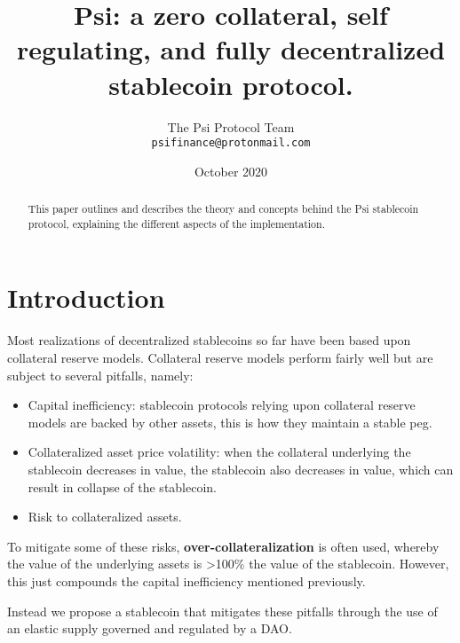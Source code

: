 \documentclass[a4paper, 12pt]{article}
\begin{document}
	\title{\Large{\textbf{Psi: a zero collateral, self regulating, and fully decentralized stablecoin protocol.}}}
	\author{The Psi Protocol Team \\ \texttt{psifinance@protonmail.com}}
	\date{October 2020}

	\maketitle

	\begin{abstract}
		This paper outlines and describes the theory and concepts behind the Psi stablecoin protocol, explaining the different aspects of the implementation. 
	\end{abstract}

	\newpage
	
	\tableofcontents

	\newpage

	\section{Introduction}
	Most realizations of decentralized stablecoins so far have been based upon collateral reserve models. Collateral reserve models perform fairly well but are subject to several pitfalls, namely:
	
	\begin{itemize}
		
		\item{Capital inefficiency: stablecoin protocols relying upon collateral reserve models are backed by other assets, this is how they maintain a stable peg.}
		\item{Collateralized asset price volatility: when the collateral underlying the stablecoin decreases in value, the stablecoin also decreases in value, which can result in collapse of the stablecoin.}
		\item{Risk to collateralized assets.}
		
	\end{itemize}

	To mitigate some of these risks, \textbf{over-collateralization} is often used, whereby the value of the underlying assets is \textgreater100\% the value of the stablecoin. However, this just compounds 	the capital inefficiency mentioned previously. \newline
	

	Instead we propose a stablecoin that mitigates these pitfalls through the use of an elastic supply governed and regulated by a DAO.
\end{document}
